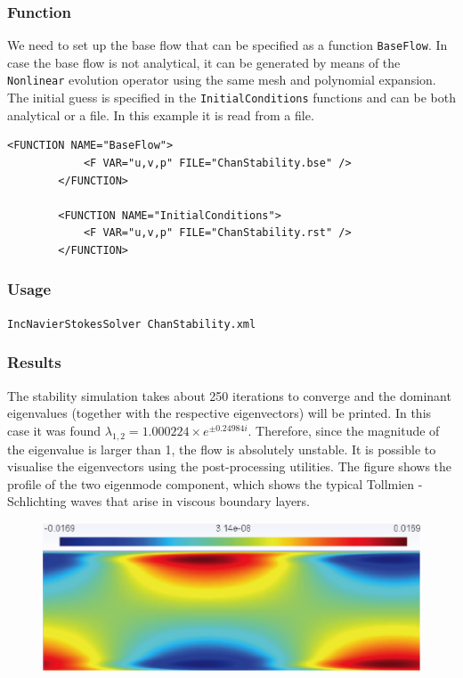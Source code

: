 \subsubsection{Function}

We need to set up the base flow that can be specified as a function \texttt{BaseFlow}. In case the base flow is not analytical, it can be generated by means of the \texttt{Nonlinear} evolution operator using the same mesh and polynomial expansion. The initial guess is specified in the \texttt{InitialConditions} functions and can be both analytical or a file. In this example it is read from a file. 

    \begin{lstlisting}[style=XMLStyle]
<FUNCTION NAME="BaseFlow">
            <F VAR="u,v,p" FILE="ChanStability.bse" />
        </FUNCTION>

        <FUNCTION NAME="InitialConditions">
            <F VAR="u,v,p" FILE="ChanStability.rst" />
        </FUNCTION>
                         \end{lstlisting}



\subsubsection{Usage}

\texttt{IncNavierStokesSolver ChanStability.xml}


\subsubsection{Results}

The stability simulation takes about 250 iterations to converge and the dominant eigenvalues (together with the respective eigenvectors) will be printed. In this case it was found $    \lambda_{1,2}=1.000224 \times e^{\pm 0.24984i}$. Therefore, since the magnitude of the eigenvalue is larger than 1, the flow is absolutely unstable. It is possible to visualise the eigenvectors using the post-processing utilities. The figure shows the profile of the two eigenmode component, which shows the typical Tollmien - Schlichting waves that arise in viscous boundary layers.

\begin{figure}[!htbp]
\centering
 {\includegraphics[width=1 \textwidth]{Figures/chan_u.png}}
   \caption {}
\end{figure}

